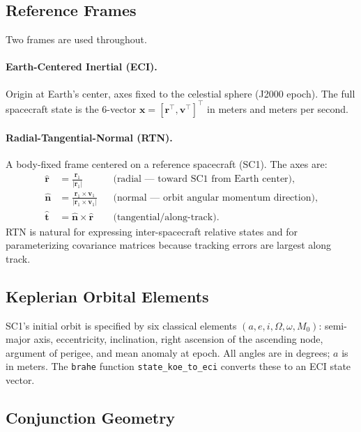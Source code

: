 \documentclass[11pt]{article}
\begin{document}
\subsection{Reference Frames}

Two frames are used throughout.

\paragraph{Earth-Centered Inertial (ECI).}  Origin at Earth's center, axes
fixed to the celestial sphere (J2000 epoch).  The full spacecraft state is the
6-vector $\mathbf{x} = [\mathbf{r}^\top, \mathbf{v}^\top]^\top$ in meters and
meters per second.

\paragraph{Radial-Tangential-Normal (RTN).}  A body-fixed frame centered on a
reference spacecraft (SC1).  The axes are:
\begin{align}
  \hat{\mathbf{r}} &= \frac{\mathbf{r}_1}{|\mathbf{r}_1|}
    && \text{(radial — toward SC1 from Earth center)}, \\
  \hat{\mathbf{n}} &= \frac{\mathbf{r}_1 \times \mathbf{v}_1}
                           {|\mathbf{r}_1 \times \mathbf{v}_1|}
    && \text{(normal — orbit angular momentum direction)}, \\
  \hat{\mathbf{t}} &= \hat{\mathbf{n}} \times \hat{\mathbf{r}}
    && \text{(tangential/along-track)}.
\end{align}
RTN is natural for expressing inter-spacecraft relative states and for
parameterizing covariance matrices because tracking errors are largest along
track.

\subsection{Keplerian Orbital Elements}

SC1's initial orbit is specified by six classical elements
$(a, e, i, \Omega, \omega, M_0)$:
semi-major axis, eccentricity, inclination, right ascension of the ascending
node, argument of perigee, and mean anomaly at epoch.  All angles are in
degrees; $a$ is in meters.  The \texttt{brahe} function
\texttt{state\_koe\_to\_eci} converts these to an ECI state vector.

\subsection{Conjunction Geometry}
\end{document}
